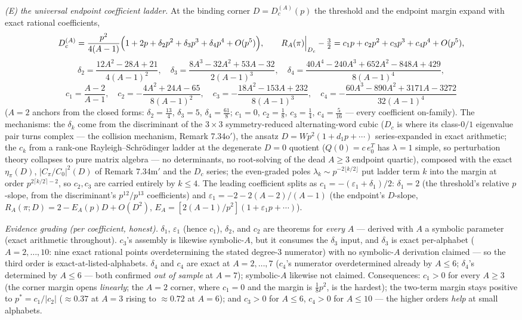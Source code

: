 \documentclass[
]{article}
\begin{document}
\emph{(E) the universal endpoint coefficient ladder.} At the binding corner
$D=D_c^{(A)}(p)$ the threshold and the endpoint margin expand with exact
rational coefficients,
\[
  D_c^{(A)}=\frac{p^2}{4(A-1)}\Bigl(1+2p+\delta_2p^2+\delta_3p^3+\delta_4p^4
  +O(p^5)\Bigr),\qquad
  R_A(\pi)\Big|_{D_c}-\tfrac32=c_1p+c_2p^2+c_3p^3+c_4p^4+O(p^5),
\]
\[
  \delta_2=\frac{12A^2-28A+21}{4(A-1)^2},\quad
  \delta_3=\frac{8A^3-32A^2+53A-32}{2(A-1)^3},\quad
  \delta_4=\frac{40A^4-240A^3+652A^2-848A+429}{8(A-1)^4},
\]
\[
  c_1=\frac{A-2}{A-1},\quad
  c_2=-\frac{4A^2+24A-65}{8(A-1)^2},\quad
  c_3=-\frac{18A^2-153A+232}{8(A-1)^3},\quad
  c_4=-\frac{60A^3-890A^2+3171A-3272}{32(A-1)^4}
\]
($A=2$ anchors from the closed forms: $\delta_2=\tfrac{13}4$, $\delta_3=5$,
$\delta_4=\tfrac{61}8$; $c_1=0$, $c_2=\tfrac18$, $c_3=\tfrac14$,
$c_4=\tfrac5{16}$ --- every coefficient on-family). The mechanisms: the
$\delta_k$ come from the discriminant of the $3\times3$ symmetry-reduced
alternating-word cubic ($D_c$ is where its class-$0/1$ eigenvalue pair turns
complex --- the collision mechanism, Remark 7.34o$'$), the ansatz
$D=Wp^2(1+d_1p+\cdots)$ series-expanded in exact arithmetic; the $c_k$ from a
rank-one Rayleigh--Schr\"odinger ladder at the degenerate $D=0$ quotient
($Q(0)=c\,e_0^T$ has $\lambda=1$ simple, so perturbation theory collapses to
pure matrix algebra --- no determinants, no root-solving of the dead $A\ge3$
endpoint quartic), composed with the exact $\eta_\pi(D)$, $|C_\pi/C_0|^2(D)$
of Remark 7.34m$'$ and the $D_c$ series; the even-graded poles
$\lambda_k\sim p^{-2\lfloor k/2\rfloor}$ put ladder term $k$ into the margin at
order $p^{2\lceil k/2\rceil-2}$, so $c_2,c_3$ are carried entirely by
$k\le4$. The leading coefficient splits as $c_1=-(\varepsilon_1+\delta_1)/2$:
$\delta_1=2$ (the threshold's relative $p$-slope, from the discriminant's
$p^{12}/p^{13}$ coefficients) and $\varepsilon_1=-2-2(A-2)/(A-1)$ (the
endpoint's $D$-slope, $R_A(\pi;D)=2-E_A(p)D+O(D^2)$,
$E_A=[2(A-1)/p^2](1+\varepsilon_1p+\cdots)$).

\emph{Evidence grading (per coefficient, honest).} $\delta_1$,
$\varepsilon_1$ (hence $c_1$), $\delta_2$, and $c_2$ are theorems for
\emph{every} $A$ --- derived with $A$ a symbolic parameter (exact arithmetic
throughout). $c_3$'s assembly is likewise symbolic-$A$, but it consumes the
$\delta_3$ input, and $\delta_3$ is exact per-alphabet ($A=2,\dots,10$: nine
exact rational points overdetermining the stated degree-$3$ numerator) with no
symbolic-$A$ derivation claimed --- so the third order is
exact-at-listed-alphabets. $\delta_4$ and $c_4$ are exact at $A=2,\dots,7$
($c_4$'s numerator overdetermined already by $A\le6$; $\delta_4$'s determined
by $A\le6$ --- both confirmed \emph{out of sample} at $A=7$); symbolic-$A$ likewise not claimed. Consequences: $c_1>0$
for every $A\ge3$ (the corner margin opens \emph{linearly}; the $A=2$ corner,
where $c_1=0$ and the margin is $\tfrac18p^2$, is the hardest); the two-term
margin stays positive to $p^*=c_1/|c_2|$ ($\approx0.37$ at $A=3$ rising to
$\approx0.72$ at $A=6$); and $c_3>0$ for $A\le6$, $c_4>0$ for $A\le10$ ---
the higher orders \emph{help} at small alphabets.
\end{document}
